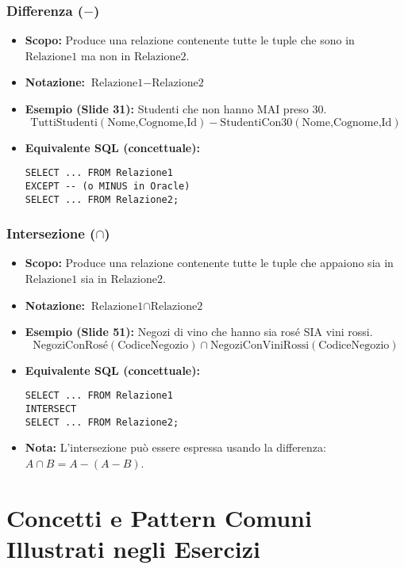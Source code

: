 \subsubsection[Differenza (-)]{Differenza ($-$)}
\begin{itemize}
    \item \textbf{Scopo:} Produce una relazione contenente tutte le tuple che sono in $\text{Relazione1}$ ma non in $\text{Relazione2}$.
    \item \textbf{Notazione:} $\text{Relazione1} - \text{Relazione2}$
    \item \textbf{Esempio (Slide 31):} Studenti che non hanno MAI preso 30.
          \[ \text{TuttiStudenti}(\text{Nome,Cognome,Id}) - \text{StudentiCon30}(\text{Nome,Cognome,Id}) \]
    \item \textbf{Equivalente SQL (concettuale):}
\begin{verbatim}
SELECT ... FROM Relazione1
EXCEPT -- (o MINUS in Oracle)
SELECT ... FROM Relazione2;
\end{verbatim}
\end{itemize}

\subsubsection[Intersezione (intersezione)]{Intersezione ($\cap$)}
\begin{itemize}
    \item \textbf{Scopo:} Produce una relazione contenente tutte le tuple che appaiono sia in $\text{Relazione1}$ sia in $\text{Relazione2}$.
    \item \textbf{Notazione:} $\text{Relazione1} \cap \text{Relazione2}$
    \item \textbf{Esempio (Slide 51):} Negozi di vino che hanno sia rosé SIA vini rossi.
          \[ \text{NegoziConRosé}(\text{CodiceNegozio}) \cap \text{NegoziConViniRossi}(\text{CodiceNegozio}) \]
    \item \textbf{Equivalente SQL (concettuale):}
\begin{verbatim}
SELECT ... FROM Relazione1
INTERSECT
SELECT ... FROM Relazione2;
\end{verbatim}
    \item \textbf{Nota:} L'intersezione può essere espressa usando la differenza: $A \cap B = A - (A - B)$.
\end{itemize}

\section{Concetti e Pattern Comuni Illustrati negli Esercizi}

